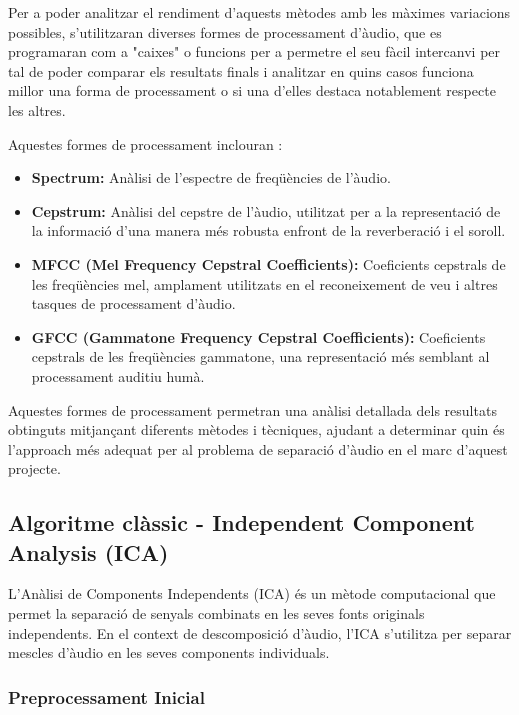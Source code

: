 \documentclass[10pt,a4paper,twocolumn,twoside]{article}
\begin{document}
Per a poder analitzar el rendiment d'aquests mètodes amb les màximes variacions possibles, s'utilitzaran diverses formes de processament d'àudio, que es programaran com a "caixes" o funcions per a permetre el seu fàcil intercanvi per tal de poder comparar els resultats finals i analitzar en quins casos funciona millor una forma de processament o si una d'elles destaca notablement respecte les altres. 

Aquestes formes de processament inclouran \cite{audio-processing-ML}:

\begin{itemize}
\item \textbf{Spectrum:} Anàlisi de l'espectre de freqüències de l'àudio.
\item \textbf{Cepstrum:} Anàlisi del cepstre de l'àudio, utilitzat per a la representació de la informació d'una manera més robusta enfront de la reverberació i el soroll.
\item \textbf{MFCC (Mel Frequency Cepstral Coefficients):} Coeficients cepstrals de les freqüències mel, amplament utilitzats en el reconeixement de veu i altres tasques de processament d'àudio.
\item \textbf{GFCC (Gammatone Frequency Cepstral Coefficients):} Coeficients cepstrals de les freqüències gammatone, una representació més semblant al processament auditiu humà.
\end{itemize}

Aquestes formes de processament permetran una anàlisi detallada dels resultats obtinguts mitjançant diferents mètodes i tècniques, ajudant a determinar quin és l'approach més adequat per al problema de separació d'àudio en el marc d'aquest projecte.

\subsection{Algoritme clàssic - Independent Component Analysis (ICA)}

L'Anàlisi de Components Independents (ICA) és un mètode computacional que permet la separació de senyals combinats en les seves fonts originals independents. En el context de descomposició d'àudio, l'ICA s'utilitza per separar mescles d'àudio en les seves components individuals.

\subsubsection{Preprocessament Inicial}
\end{document}
